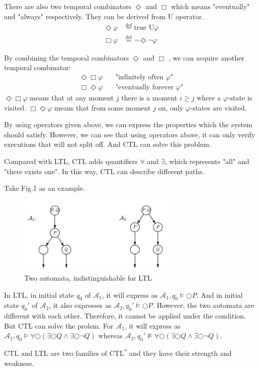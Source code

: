 \documentclass{acmtog} %
\begin{document}
    There are also two temporal combinators $\Diamond$ and $\Box$ which means "eventually" and "always" respectively. They can be derived from U operator.
    \begin{equation*}
        \begin{aligned}
        \Diamond\varphi & \overset{\text{def}}{=}\text{true U}\varphi\\
      \Box\varphi & \overset{\text{def}}{=}\neg\Diamond\neg\varphi
        \end{aligned}
    \end{equation*}
    
    By combining the temporal combinators $\Diamond$ and $\Box$ , we can acquire another temporal combinator:
    \begin{equation*}
      \begin{aligned}
        \Diamond\Box\varphi & \quad\text{"infinitely often $\varphi$"}\\
        \Box\Diamond\varphi & \quad\text{"eventually forever $\varphi$"}
      \end{aligned}
    \end{equation*}
    $\Diamond\Box\varphi$ means that at any moment $j$ there is a moment $i\geqslant j$ where a $\varphi$-state is visited. $ \Box\Diamond\varphi$ means that from some moment $j$ on, only $\varphi$-states are visited.
    
    By using operators given above, we can express the properties which the system should satisfy. However, we can see that using operators above, it can only verify executions that will not split off. And CTL can solve this problem.
    
    Compared with LTL, CTL adds quantifiers $\forall$ and $\exists$, which represents "all" and "there exists one". In this way, CTL can describe different paths.
    
    Take Fig.1 as an example.
    \begin{figure}[H]
      \centering
      \includegraphics[width=3.0in]{5.jpg}
      \caption{Two automata, indistinguishable for LTL}
    \end{figure}
    
    In LTL, in initial state $q_0$ of $\mathcal{A}_1$, it will express as $\mathcal{A}_1,q_0\models\bigcirc P$. And in initial state $q_0'$ of $\mathcal{A}_2$, it also expresses as $\mathcal{A}_2,q_0'\models\bigcirc P$. However, the two automata are different with each other. Therefore, it cannot be applied under the condition. But CTL can solve the prolem. For $\mathcal{A}_1$, it will express as $\mathcal{A}_1,q_0\models\forall\bigcirc(\exists\bigcirc Q\wedge\exists\bigcirc\neg Q)$ whereas $\mathcal{A}_2,q_0'\nvDash\forall\bigcirc(\exists\bigcirc Q\wedge\exists\bigcirc\neg Q)$.
    
    CTL and LTL are two families of $\text{CTL}^*$ and they have their strength and weakness.
\end{document}
